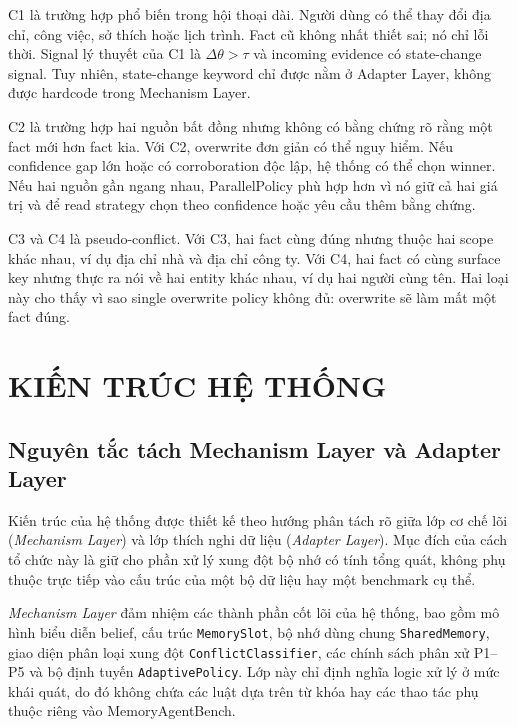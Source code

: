 \documentclass[12pt,a4paper]{article}
\newcommand{\code}[1]{\texttt{#1}}
\begin{document}
C1 là trường hợp phổ biến trong hội thoại dài. Người dùng có thể thay đổi địa chỉ, công việc, sở thích hoặc lịch trình. Fact cũ không nhất thiết sai; nó chỉ lỗi thời. Signal lý thuyết của C1 là \(\Delta\theta > \tau\) và incoming evidence có state-change signal. Tuy nhiên, state-change keyword chỉ được nằm ở Adapter Layer, không được hardcode trong Mechanism Layer.

C2 là trường hợp hai nguồn bất đồng nhưng không có bằng chứng rõ rằng một fact mới hơn fact kia. Với C2, overwrite đơn giản có thể nguy hiểm. Nếu confidence gap lớn hoặc có corroboration độc lập, hệ thống có thể chọn winner. Nếu hai nguồn gần ngang nhau, ParallelPolicy phù hợp hơn vì nó giữ cả hai giá trị và để read strategy chọn theo confidence hoặc yêu cầu thêm bằng chứng.

C3 và C4 là pseudo-conflict. Với C3, hai fact cùng đúng nhưng thuộc hai scope khác nhau, ví dụ địa chỉ nhà và địa chỉ công ty. Với C4, hai fact có cùng surface key nhưng thực ra nói về hai entity khác nhau, ví dụ hai người cùng tên. Hai loại này cho thấy vì sao single overwrite policy không đủ: overwrite sẽ làm mất một fact đúng.

\section{KIẾN TRÚC HỆ THỐNG}

\subsection{Nguyên tắc tách Mechanism Layer và Adapter Layer}

Kiến trúc của hệ thống được thiết kế theo hướng phân tách rõ giữa lớp cơ chế lõi (\textit{Mechanism Layer}) và lớp thích nghi dữ liệu (\textit{Adapter Layer}). Mục đích của cách tổ chức này là giữ cho phần xử lý xung đột bộ nhớ có tính tổng quát, không phụ thuộc trực tiếp vào cấu trúc của một bộ dữ liệu hay một benchmark cụ thể.

\textit{Mechanism Layer} đảm nhiệm các thành phần cốt lõi của hệ thống, bao gồm mô hình biểu diễn belief, cấu trúc \code{MemorySlot}, bộ nhớ dùng chung \code{SharedMemory}, giao diện phân loại xung đột \code{ConflictClassifier}, các chính sách phân xử P1--P5 và bộ định tuyến \code{AdaptivePolicy}. Lớp này chỉ định nghĩa logic xử lý ở mức khái quát, do đó không chứa các luật dựa trên từ khóa hay các thao tác phụ thuộc riêng vào MemoryAgentBench.
\end{document}
